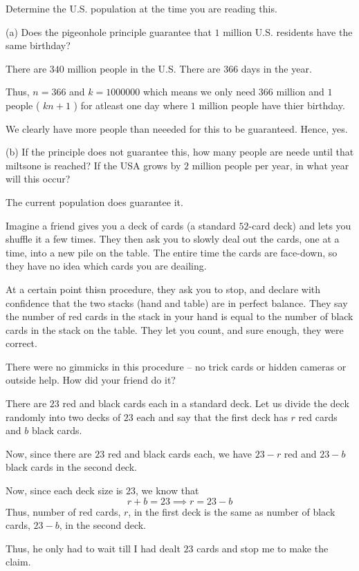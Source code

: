 \begin{problem}
	Determine the U.S. population at the time you are reading this.
	
	(a) Does the pigeonhole principle guarantee that $1$ million U.S.  residents have the same birthday?
	\begin{solution}
		There are $340$ million people in the U.S. There are $366$ days in the year.

		Thus, $n = 366$ and $k = 1000000$ which means we only need $366$ million and $1$ people ( $kn+1$ ) for atleast one day where $1$ million people have thier birthday.

		We clearly have more people than neeeded for this to be guaranteed. Hence, yes.
	\end{solution}


	(b) If the principle does not guarantee this, how many people are neede until that miltsone is reached? If the USA grows by $2$ million people per year, in what year will this occur?
	\begin{solution} The current population does guarantee it. \end{solution}
\end{problem}


\begin{problem}
Imagine a friend gives you a deck of cards (a standard $52$-card deck) and lets you shuffle it a few times. They then ask you to slowly deal out the cards, one at a time, into a new pile on the table. The entire time the cards are face-down, so they have no idea which cards you are deailing.

At a certain point thisn procedure, they ask you to stop, and declare with confidence that the two stacks (hand and table) are in perfect balance.
They say the number of red cards in the stack in your hand is equal to the number of black cards in the stack on the table.
They let you count, and sure enough, they were correct.

There were no gimmicks in this procedure -- no trick cards or hidden cameras or outside help. How did your friend do it?
\end{problem}

\begin{solution}
	There are $23$ red and black cards each in a standard deck. 
	Let us divide the deck randomly into two decks of $23$ each and say that the first deck has $r$ red cards and $b$ black cards.

	Now, since there are $23$ red and black cards each, we have $23-r$ red and $23-b$ black cards in the second deck.

	Now, since each deck size is $23$, we know that 
	$$r + b = 23 \implies r = 23 - b$$
	Thus, number of red cards, $r$, in the first deck is the same as number of black cards, $23-b$, in the second deck.

	Thus, he only had to wait till I had dealt $23$ cards and stop me to make the claim.
\end{solution}

